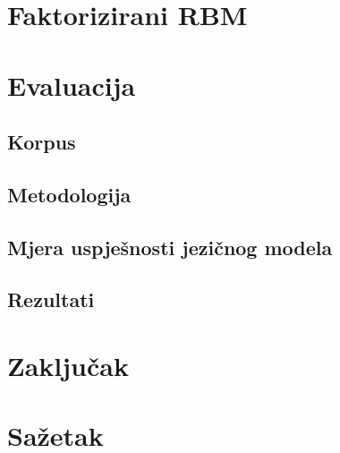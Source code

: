 \documentclass[times, utf8, diplomski, numeric]{fer}
\begin{document}
\chapter{Faktorizirani RBM}

\chapter{Evaluacija}

\section{Korpus}

\section{Metodologija}

\section{Mjera uspješnosti jezičnog modela}

\section{Rezultati}

\chapter{Zaključak} 




\chapter{Sažetak}
\end{document}
